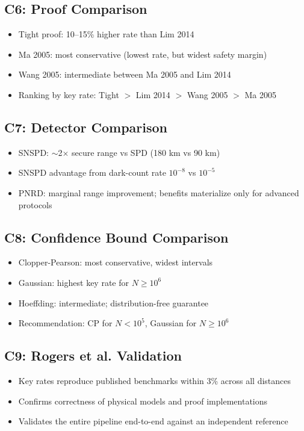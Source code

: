 \documentclass[11pt,a4paper,oneside]{report}
\begin{document}
\subsection{C6: Proof Comparison}
\begin{itemize}
\item Tight proof: 10–15\% higher rate than Lim 2014
\item Ma 2005: most conservative (lowest rate, but widest safety margin)
\item Wang 2005: intermediate between Ma 2005 and Lim 2014
\item Ranking by key rate: Tight $>$ Lim 2014 $>$ Wang 2005 $>$ Ma 2005
\end{itemize}

\subsection{C7: Detector Comparison}
\begin{itemize}
\item SNSPD: $\sim$2$\times$ secure range vs SPD (180 km vs 90 km)
\item SNSPD advantage from dark-count rate $10^{-8}$ vs $10^{-5}$
\item PNRD: marginal range improvement; benefits materialize only for advanced protocols
\end{itemize}

\subsection{C8: Confidence Bound Comparison}
\begin{itemize}
\item Clopper-Pearson: most conservative, widest intervals
\item Gaussian: highest key rate for $N \geq 10^6$
\item Hoeffding: intermediate; distribution-free guarantee
\item Recommendation: CP for $N < 10^5$, Gaussian for $N \geq 10^6$
\end{itemize}

\subsection{C9: Rogers et al. Validation}
\begin{itemize}
\item Key rates reproduce published benchmarks within 3\% across all distances
\item Confirms correctness of physical models and proof implementations
\item Validates the entire pipeline end-to-end against an independent reference
\end{itemize}
\end{document}
